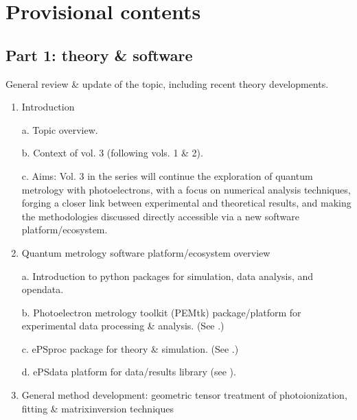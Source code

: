 \documentclass[letterpaper,10pt,english]{jupyterBook}
\begin{document}
\section{Provisional contents}
\label{\detokenize{frontmatter/overview_270122:provisional-contents}}

\subsection{Part 1: theory \& software}
\label{\detokenize{frontmatter/overview_270122:part-1-theory-software}}
\sphinxAtStartPar
General review \& update of the topic, including recent theory developments.
\begin{enumerate}
%
\item {} 
\sphinxAtStartPar
Introduction

\sphinxAtStartPar
a.  Topic overview.

\sphinxAtStartPar
b.  Context of vol. 3 (following vols. 1 \& 2).

\sphinxAtStartPar
c.  Aims: Vol. 3 in the series will continue the exploration of quantum metrology with photoelectrons, with a focus on numerical analysis techniques, forging a closer link between experimental and theoretical results, and making the methodologies discussed directly accessible via a new software platform/ecosystem.

\item {} 
\sphinxAtStartPar
Quantum metrology software platform/ecosystem overview

\sphinxAtStartPar
a.  Introduction to python packages for simulation, data analysis, and open\sphinxhyphen{}data.

\sphinxAtStartPar
b.  Photoelectron metrology toolkit (PEMtk) package/platform for experimental data processing \& analysis. (See .)

\sphinxAtStartPar
c.  ePSproc package for theory \& simulation. (See .)

\sphinxAtStartPar
d.  ePSdata platform for data/results library (see ).

\item {} 
\sphinxAtStartPar
General method development: geometric tensor treatment of
photoionization, fitting \& matrix\sphinxhyphen{}inversion techniques


\end{enumerate}
\end{document}
